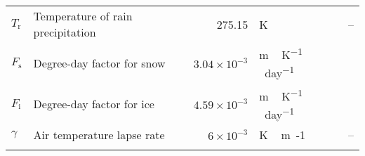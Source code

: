 \documentclass[tc, manuscript]{copernicus}
\begin{document}
\begin{table*}
{\begin{tabular}{llrll}
    $T_{\mathrm{r}}$   & Temperature of rain precipitation
            & 275.15
            & \unit{K}
            & -- \\

    $F_{\mathrm{s}}$   & Degree-day factor for snow
            & $3.04\times10^{-3}$
            & \unit{m\,K^{-1}\,day^{-1}}
            & \citet{Shea.etal.2009} \\

    $F_{\mathrm{i}}$   & Degree-day factor for ice
            & $4.59\times10^{-3}$
            & \unit{m\,K^{-1}\,day^{-1}}
            & \citet{Shea.etal.2009} \\

    $\gamma$& Air temperature lapse rate
            & $6\times10^{-3}$
            & \unit{K\,m{-1}}
            & -- \\

    \bottomhline
\end{tabular}}
\end{table*}
\end{document}
